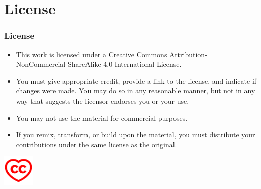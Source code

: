 \documentclass{beamer}
\begin{document}
\section{License}

\begin{frame}
\frametitle{License}
\begin{itemize}
    \item  This work is licensed under a Creative Commons Attribution-NonCommercial-ShareAlike 4.0 International License.
    \item You must give appropriate credit, provide a link to the license, and indicate if changes were made. You may do so in any reasonable manner, but not in any way that suggests the licensor endorses you or your use.
    \item You may not use the material for commercial purposes.
    \item If you remix, transform, or build upon the material, you must distribute your contributions under the same license as the original.
\end{itemize}
\includegraphics[width=1.5cm]{heart.red.png}
\end{frame}
\end{document}
